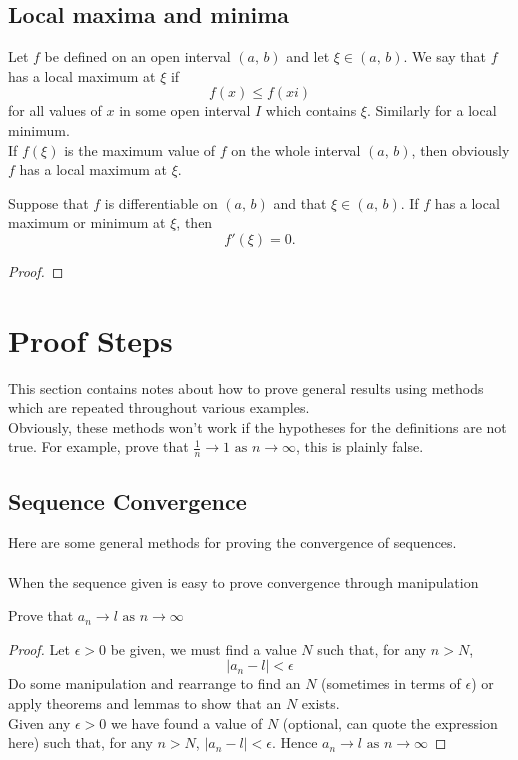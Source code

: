 \documentclass[10pt, a4paper]{article}
\newcommand{\limas}[3][n]{#2 \rightarrow #3 \text{ as } #1 \rightarrow \infty}
\begin{document}
\subsection{Local maxima and minima}
Let $f$ be defined on an open interval $(a,\,b)$ and let $\xi \in (a,\,b)$. We say that $f$ has a local maximum at $\xi$ if
\[
f(x) \leq f(xi)
\]
for all values of $x$ in some open interval $I$ which contains $\xi$. Similarly for a local minimum. \\
If $f(\xi)$ is the maximum value of $f$ on the whole interval $(a,\,b)$, then obviously $f$ has a local maximum at $\xi$.

\begin{theorem}
    Suppose that $f$ is differentiable on $(a,\,b)$ and that $\xi \in (a,\,b)$. If $f$ has a local maximum or minimum at $\xi$, then
    \[
    f'(\xi) = 0.
    \]
    \begin{proof}
        
    \end{proof}
\end{theorem}

\newpage

\section{Proof Steps}
This section contains notes about how to prove general results using methods which are repeated throughout various examples.
\\
Obviously, these methods won't work if the hypotheses for the definitions are not true. For example, prove that $\limas{\frac{1}{n}}{1}$, this is plainly false.

\subsection{Sequence Convergence}
Here are some general methods for proving the convergence of sequences. \\
\\
When the sequence given is easy to prove convergence through manipulation
\begin{theorem}
    Prove that $\limas{a_n}{l}$
    \begin{proof}
    Let $\epsilon > 0$ be given, we must find a value $N$ such that, for any $n > N$,
    \[|a_n - l| < \epsilon\]
    Do some manipulation and rearrange to find an $N$ (sometimes in terms of $\epsilon$) or apply theorems and lemmas to show that an $N$ exists. \\
    Given any $\epsilon > 0$ we have found a value of $N$ (optional, can quote the expression here) such that, for any $n > N$, $|a_n - l| < \epsilon$. Hence $\limas{a_n}{l}$
    \end{proof}
\end{theorem}
\end{document}
